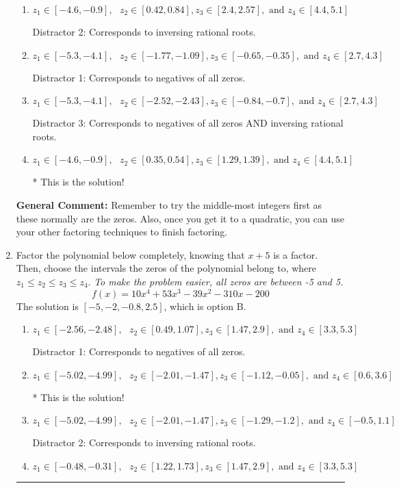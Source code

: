 \documentclass{extbook}[14pt]
\newcommand{\litem}[1]{\item #1

\rule{\textwidth}{0.4pt}}
\begin{document}
\begin{enumerate}
{\begin{enumerate}[label=\Alph*.]
 Distractor 4: Corresponds to moving factors from one rational to another.
\item \( z_1 \in [-4.6, -0.9], \text{   }  z_2 \in [0.42, 0.84], z_3 \in [2.4, 2.57], \text{   and   } z_4 \in [4.4, 5.1] \)

 Distractor 2: Corresponds to inversing rational roots.
\item \( z_1 \in [-5.3, -4.1], \text{   }  z_2 \in [-1.77, -1.09], z_3 \in [-0.65, -0.35], \text{   and   } z_4 \in [2.7, 4.3] \)

 Distractor 1: Corresponds to negatives of all zeros.
\item \( z_1 \in [-5.3, -4.1], \text{   }  z_2 \in [-2.52, -2.43], z_3 \in [-0.84, -0.7], \text{   and   } z_4 \in [2.7, 4.3] \)

 Distractor 3: Corresponds to negatives of all zeros AND inversing rational roots.
\item \( z_1 \in [-4.6, -0.9], \text{   }  z_2 \in [0.35, 0.54], z_3 \in [1.29, 1.39], \text{   and   } z_4 \in [4.4, 5.1] \)

* This is the solution!
\end{enumerate}

\textbf{General Comment:} Remember to try the middle-most integers first as these normally are the zeros. Also, once you get it to a quadratic, you can use your other factoring techniques to finish factoring.
}
\litem{
Factor the polynomial below completely, knowing that $x + 5$ is a factor. Then, choose the intervals the zeros of the polynomial belong to, where $z_1 \leq z_2 \leq z_3 \leq z_4$. \textit{To make the problem easier, all zeros are between -5 and 5.}
\[ f(x) = 10x^{4} +53 x^{3} -39 x^{2} -310 x -200 \]The solution is \( [-5, -2, -0.8, 2.5] \), which is option B.\begin{enumerate}[label=\Alph*.]
\item \( z_1 \in [-2.56, -2.48], \text{   }  z_2 \in [0.49, 1.07], z_3 \in [1.47, 2.9], \text{   and   } z_4 \in [3.3, 5.3] \)

 Distractor 1: Corresponds to negatives of all zeros.
\item \( z_1 \in [-5.02, -4.99], \text{   }  z_2 \in [-2.01, -1.47], z_3 \in [-1.12, -0.05], \text{   and   } z_4 \in [0.6, 3.6] \)

* This is the solution!
\item \( z_1 \in [-5.02, -4.99], \text{   }  z_2 \in [-2.01, -1.47], z_3 \in [-1.29, -1.2], \text{   and   } z_4 \in [-0.5, 1.1] \)

 Distractor 2: Corresponds to inversing rational roots.
\item \( z_1 \in [-0.48, -0.31], \text{   }  z_2 \in [1.22, 1.73], z_3 \in [1.47, 2.9], \text{   and   } z_4 \in [3.3, 5.3] \)


\end{enumerate}}
\end{enumerate}
\end{document}
